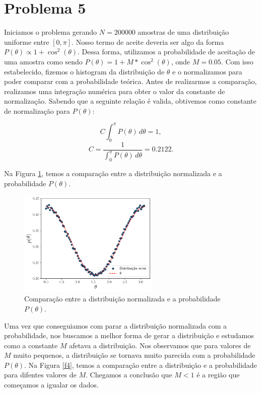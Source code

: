 \documentclass[a4paper, 12pt]{article}
\begin{document}
\section*{Problema 5}

Iniciamos o problema gerando \(N = 200000\) amostras de uma distribuição uniforme entre \([0,\pi]\).
Nosso termo de aceite deveria ser algo da forma \(P(\theta) \propto 1 + \cos^2(\theta)\). Dessa 
forma, utilizamos a probabilidade de aceitação de uma amostra como sendo \(P(\theta) = 1 + M*
\cos^2(\theta)\), onde \(M = 0.05\). Com isso estabelecido, fizemos o histogram da distribuição de \(\theta\) e o 
normalizamos para poder comparar com a probabilidade teórica. Antes de realizarmos a comparação, 
realizamos uma integração numérica para obter o valor da constante de normalização. Sabendo que
a seguinte relação é valida, obtivemos como constante de normalização para \(P(\theta)\):

\begin{equation}
    C\int_{0}^{\pi} P(\theta) \, d\theta = 1,
\end{equation}
\begin{equation}
    C = \frac{1}{\int_{0}^{\pi} P(\theta) \, d\theta} = 0.2122.
\end{equation}

Na Figura \ref{f3}, temos a comparação entre a distribuição normalizada e a probabilidade 
\(P(\theta)\).
\begin{figure}[!htb]
    \centering
    \includegraphics[width=0.6\textwidth]{distribuicao_theta_0.05.pdf}
    \caption{Comparação entre a distribuição normalizada e a probabilidade \(P(\theta)\).}
    \label{f3}
\end{figure}

Uma vez que conseguiamos com parar a distribuição normalizada com a probabilidade, nos buscamos 
a melhor forma de gerar a distribuição e estudamos como a constante \(M\) afetava a distribuição.
Nos observamos que para valores de \(M\) muito pequenos, a distribuição se tornava muito parecida 
com a probabilidade \(P(\theta)\). Na Figura \ref{f4}, temos a comparação entre a distribuição e 
a probabilidade para difentes valores de \(M\). Chegamos a conclusão que \(M < 1\) é a região que
começamos a igualar os dados.
\end{document}
